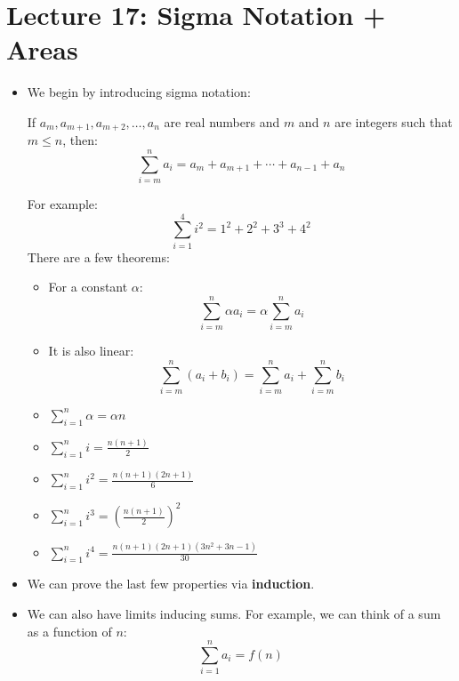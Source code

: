 \section{Lecture 17: Sigma Notation + Areas}
\begin{itemize}
    \item We begin by introducing sigma notation:
    \begin{definition}
        If $a_m,a_{m+1},a_{m+2},\dots,a_n$ are real numbers and $m$ and $n$ are integers such that $m\le n$, then:
        \begin{equation}
            \sum_{i=m}^{n}a_i=a_m+a_{m+1}+\cdots+a_{n-1}+a_n
            \label{eq:}
        \end{equation}
    \end{definition}
    For example:
    \begin{equation}
        \sum_{i=1}^4 i^2 = 1^2+2^2+3^3+4^2
        \label{eq:}
    \end{equation}
    There are a few theorems:
    \begin{itemize}
        \item For a constant $\alpha$:
        \begin{equation}
            \sum_{i=m}^n \alpha a_i = \alpha\sum_{i=m}^n a_i
            \label{eq:}
        \end{equation}
        \item It is also linear:
        \begin{equation}
            \sum_{i=m}^n (a_i+b_i) = \sum_{i=m}^na_i + \sum_{i=m}^nb_i
            \label{eq:}
        \end{equation}
        \item $\sum_{i=1}^n \alpha = \alpha n$
        \item $\sum_{i=1}^n i = \frac{n(n+1)}{2}$
        \item $\sum_{i=1}^n i^2 = \frac{n(n+1)(2n+1)}{6}$
        \item $\sum_{i=1}^n i^3 = \left(\frac{n(n+1)}{2}\right)^2$
        \item $\sum_{i=1}^n i^4 = \frac{n(n+1)(2n+1)(3n^2+3n-1)}{30}$
    \end{itemize}
    \item We can prove the last few properties via \textbf{induction}.
    \item We can also have limits inducing sums. For example, we can think of a sum as a function of $n$:
    \begin{equation}
        \sum_{i=1}^n a_i = f(n)
        \label{eq:}

\end{equation}
\end{itemize}
